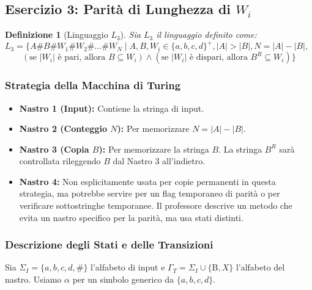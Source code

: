 \documentclass[a4paper, 11pt]{book} %
\newtheorem{definition}[theorem]{Definizione}
\theoremstyle{definition}
\newcommand{\B}{\text{B}} %
\begin{document}
\subsection{Esercizio 3: Parità di Lunghezza di $W_i$}

\begin{definition}[Linguaggio $L_3$]
Sia $L_3$ il linguaggio definito come:
$L_3 = \{A\#B\#W_1 \# W_2 \# \dots \# W_N \mid A, B, W_i \in \{a,b,c,d\}^+, |A| > |B|, N = |A| - |B|, $
$\qquad (\text{se } |W_i| \text{ è pari, allora } B \subseteq W_i) \land (\text{se } |W_i| \text{ è dispari, allora } B^R \subseteq W_i) \}$
\end{definition}

\subsubsection{Strategia della Macchina di Turing}
\begin{itemize}
    \item \textbf{Nastro 1 (Input):} Contiene la stringa di input.
    \item \textbf{Nastro 2 (Conteggio $N$):} Per memorizzare $N = |A| - |B|$.
    \item \textbf{Nastro 3 (Copia $B$):} Per memorizzare la stringa $B$. La stringa $B^R$ sarà controllata rileggendo $B$ dal Nastro 3 all'indietro.
    \item \textbf{Nastro 4:} Non esplicitamente usata per copie permanenti in questa strategia, ma potrebbe servire per un flag temporaneo di parità o per verificare sottostringhe temporanee. Il professore descrive un metodo che evita un nastro specifico per la parità, ma usa stati distinti.
\end{itemize}

\subsubsection{Descrizione degli Stati e delle Transizioni}
Sia $\Sigma_I = \{a,b,c,d,\#\}$ l'alfabeto di input e $\Gamma_T = \Sigma_I \cup \{\B, X\}$ l'alfabeto del nastro. Usiamo $\alpha$ per un simbolo generico da $\{a,b,c,d\}$.
\end{document}
